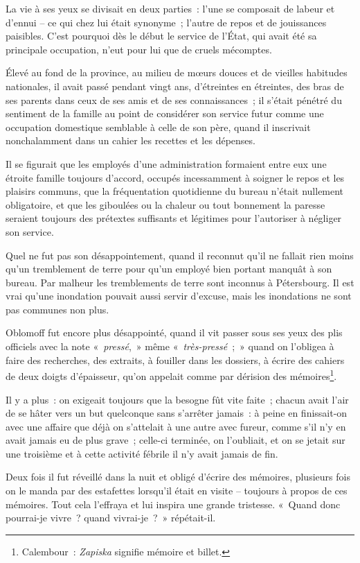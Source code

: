 \documentclass[french,twoside]{book} %
\begin{document}
La vie à ses yeux se divisait en deux parties : l’une se composait de labeur et d’ennui – ce qui chez lui était synonyme ; l’autre de repos et de jouissances paisibles. C’est pourquoi dès le début le service de l’État, qui avait été sa principale occupation, n’eut pour lui que de cruels mécomptes.\par
Élevé au fond de la province, au milieu de mœurs douces et de vieilles habitudes nationales, il avait passé pendant vingt ans, d’étreintes en étreintes, des bras de ses parents dans ceux de ses amis et de ses connaissances ; il s’était pénétré du sentiment de la famille au point de considérer son service futur comme une occupation domestique semblable à celle de son père, quand il inscrivait nonchalamment dans un cahier les recettes et les dépenses.\par
Il se figurait que les employés d’une administration formaient entre eux une étroite famille toujours d’accord, occupés incessamment à soigner le repos et les plaisirs communs, que la fréquentation quotidienne du bureau n’était nullement obligatoire, et que les giboulées ou la chaleur ou tout bonnement la paresse seraient toujours des prétextes suffisants et légitimes pour l’autoriser à négliger son service.\par
Quel ne fut pas son désappointement, quand il reconnut qu’il ne fallait rien moins qu’un tremblement de terre pour qu’un employé bien portant manquât à son bureau. Par malheur les tremblements de terre sont inconnus à Pétersbourg. Il est vrai qu’une inondation pouvait aussi servir d’excuse, mais les inondations ne sont pas communes non plus.\par
Oblomoff fut encore plus désappointé, quand il vit passer sous ses yeux des plis officiels avec la note « \emph{pressé}, » même « \emph{très-pressé} ; » quand on l’obligea à faire des recherches, des extraits, à fouiller dans les dossiers, à écrire des cahiers de deux doigts d’épaisseur, qu’on appelait comme par dérision des mémoires\footnote{Calembour : \emph{Zapiska} signifie mémoire et billet.}.\par
Il y a plus : on exigeait toujours que la besogne fût vite faite ; chacun avait l’air de se hâter vers un but quelconque sans s’arrêter jamais : à peine en finissait-on avec une affaire que déjà on s’attelait à une autre avec fureur, comme s’il n’y en avait jamais eu de plus grave ; celle-ci terminée, on l’oubliait, et on se jetait sur une troisième et à cette activité fébrile il n’y avait jamais de fin.\par
Deux fois il fut réveillé dans la nuit et obligé d’écrire des mémoires, plusieurs fois on le manda par des estafettes lorsqu’il était en visite – toujours à propos de ces mémoires. Tout cela l’effraya et lui inspira une grande tristesse. « Quand donc pourrai-je vivre ? quand vivrai-je ? » répétait-il.\par
\end{document}
